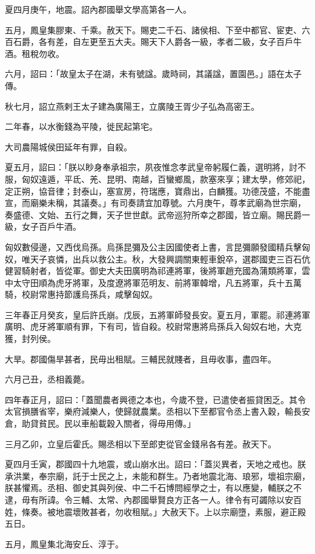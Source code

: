 \begin{pinyinscope}
夏四月庚午，地震。詔內郡國舉文學高第各一人。

五月，鳳皇集膠東、千乘。赦天下。賜吏二千石、諸侯相、下至中都官、宦吏、六百石爵，各有差，自左更至五大夫。賜天下人爵各一級，孝者二級，女子百戶牛酒。租稅勿收。

六月，詔曰：「故皇太子在湖，未有號諡。歲時祠，其議諡，置園邑。」語在太子傳。

秋七月，詔立燕剌王太子建為廣陽王，立廣陵王胥少子弘為高密王。

二年春，以水衡錢為平陵，徙民起第宅。

大司農陽城侯田延年有罪，自殺。

夏五月，詔曰：「朕以眇身奉承祖宗，夙夜惟念孝武皇帝躬履仁義，選明將，討不服，匈奴遠遁，平氐、羌、昆明、南越，百蠻鄉風，款塞來享；建太學，修郊祀，定正朔，協音律；封泰山，塞宣房，符瑞應，寶鼎出，白麟獲。功德茂盛，不能盡宣，而廟樂未稱，其議奏。」有司奏請宜加尊號。六月庚午，尊孝武廟為世宗廟，奏盛德、文始、五行之舞，天子世世獻。武帝巡狩所幸之郡國，皆立廟。賜民爵一級，女子百戶牛酒。

匈奴數侵邊，又西伐烏孫。烏孫昆彌及公主因國使者上書，言昆彌願發國精兵擊匈奴，唯天子哀憐，出兵以救公主。秋，大發興調關東輕車銳卒，選郡國吏三百石伉健習騎射者，皆從軍。御史大夫田廣明為祁連將軍，後將軍趙充國為蒲類將軍，雲中太守田順為虎牙將軍，及度遼將軍范明友、前將軍韓增，凡五將軍，兵十五萬騎，校尉常惠持節護烏孫兵，咸擊匈奴。

三年春正月癸亥，皇后許氏崩。戊辰，五將軍師發長安。夏五月，軍罷。祁連將軍廣明、虎牙將軍順有罪，下有司，皆自殺。校尉常惠將烏孫兵入匈奴右地，大克獲，封列侯。

大旱。郡國傷旱甚者，民毋出租賦。三輔民就賤者，且毋收事，盡四年。

六月己丑，丞相義薨。

四年春正月，詔曰：「蓋聞農者興德之本也，今歲不登，已遣使者振貸困乏。其令太官損膳省宰，樂府減樂人，使歸就農業。丞相以下至都官令丞上書入穀，輸長安倉，助貸貧民。民以車船載穀入關者，得毋用傳。」

三月乙卯，立皇后霍氏。賜丞相以下至郎吏從官金錢帛各有差。赦天下。

夏四月壬寅，郡國四十九地震，或山崩水出。詔曰：「蓋災異者，天地之戒也。朕承洪業，奉宗廟，託于士民之上，未能和群生。乃者地震北海、琅邪，壞祖宗廟，朕甚懼焉。丞相、御史其與列侯、中二千石博問經學之士，有以應變，輔朕之不逮，毋有所諱。令三輔、太常、內郡國舉賢良方正各一人。律令有可蠲除以安百姓，條奏。被地震壞敗甚者，勿收租賦。」大赦天下。上以宗廟墮，素服，避正殿五日。

五月，鳳皇集北海安丘、淳于。


\end{pinyinscope}
